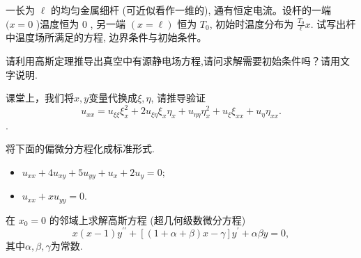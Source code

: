 \documentclass[11pt]{article}
\begin{document}
\begin{hwproblem}{}
  一长为 $\ell$ 的均匀金属细杆 (可近似看作一维的), 
  通有恒定电流。设杆的一端 $(x=0$ )温度恒为 0 , 另一端 $(x=\ell)$ 恒为 $T_0$, 
  初始时温度分布为 $\frac{T_0}{\ell} x$.
  试写出杆中温度场所满足的方程, 边界条件与初始条件。
\end{hwproblem}

\vspace{0.5cm}

\vspace{2em}


  

\begin{hwproblem}{}
请利用高斯定理推导出真空中有源静电场方程,请问求解需要初始条件吗？请用文字说明.

\end{hwproblem}

\vspace{0.5cm}

\begin{hwproblem}{}
  课堂上，我们将$x,y$变量代换成$\xi, \eta$, %
  请推导验证
  $$
  u_{x x} 
  =u_{\xi \xi} \xi_x^2+2 u_{\xi \eta} \xi_x \eta_x+u_{\eta \eta} \eta_x^2+u_{\xi} \xi_{x x}+u_\eta \eta_{x x}.
  $$.
\end{hwproblem}

\vspace{0.5cm}
 \begin{hwproblem}{}
 将下面的偏微分方程化成标准形式.
 \begin{itemize}
  \item [(1)] $
  u_{x x}+4 u_{x y}+5 u_{y y}+u_x+2 u_y=0;
  $
  \item [(2)]
  $
  u_{x x}+x u_{y y}=0.
  $

 \end{itemize}

\end{hwproblem}

\vspace{0.5cm}


\begin{hwproblem}{}
  在 $x_0=0$ 的邻域上求解高斯方程 (超几何级数微分方程) 
  $$x(x-1) y^{\prime \prime}+[(1+\alpha+\beta) x-\gamma] y^{\prime}+\alpha \beta y=0,$$
  其中$\alpha, \beta, \gamma$为常数.
\end{hwproblem}
\end{document}

